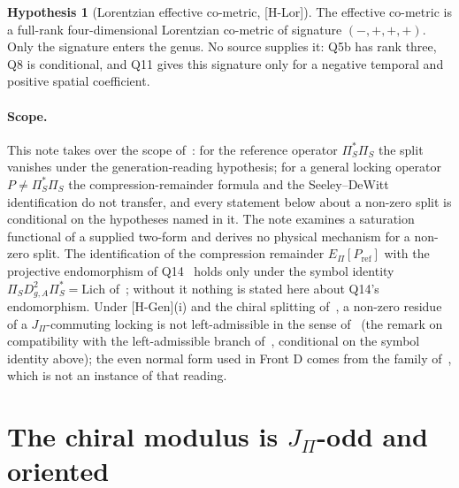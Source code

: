 \documentclass[11pt]{article}
\theoremstyle{definition}
\newtheorem{hypothesis}{Hypothesis}
\theoremstyle{remark}
\newcommand{\JPi}{J_{\Pi}}
\begin{document}
    \begin{hypothesis}[Lorentzian effective co-metric, {[H-Lor]}]
      \label{hyp:lorentzian}
      \sloppy
      The effective co-metric is a full-rank four-dimensional Lorentzian co-metric of signature $(-,+,+,+)$.
      Only the signature enters the genus.
      No source supplies it: Q5b has rank three, Q8 is conditional, and Q11 gives this signature only for a negative
      temporal and positive spatial coefficient.
    \end{hypothesis}

    \paragraph{Scope.}
    This note takes over the scope of~\cite{Beau2026prs}: for the reference operator $\Pi_S^*\Pi_S$ the split vanishes
    under the generation-reading hypothesis; for a general locking operator $P\neq\Pi_S^*\Pi_S$ the
    compression-remainder
    formula and the Seeley--DeWitt identification do not transfer, and every statement below about a non-zero split is
    conditional on the hypotheses named in it.
    The note examines a saturation functional of a supplied two-form and derives no physical mechanism for a non-zero
    split.
    The identification of the compression remainder $E_\Pi[P_{\mathrm{ref}}]$ with the projective endomorphism of
    Q14~\cite{Beau2026q14} holds only under the symbol identity $\Pi_SD_{g,A}^2\Pi_S^*=\mathrm{Lich}$ of~\cite{Beau2026prs};
    without it nothing is stated here about Q14's endomorphism.
    Under [H-Gen](i) and the chiral splitting of~\cite{Beau2026prs}, a non-zero residue of a $J_\Pi$-commuting
    locking is not left-admissible in the sense of~\cite{Beau2026q14} (the remark on compatibility with the left-admissible branch
    of~\cite{Beau2026prs}, conditional on the symbol identity above); the even normal form used in Front D comes from the family of~\cite{Beau2026ebj}, which is
    not an instance of that reading.

  \section{The chiral modulus is \texorpdfstring{$\JPi$}{J_Π}-odd and oriented}
    \label{sec:oriented}
\end{document}
